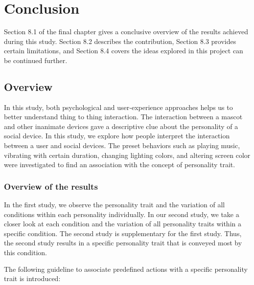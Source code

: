 \chapter{Conclusion}
\label{ch:conclusion}
Section 8.1 of the final chapter gives a conclusive overview of the results achieved during this study.
Section 8.2 describes the contribution, Section 8.3 provides certain limitations,
and Section 8.4 covers the ideas explored in this project can be continued further.

\section{Overview}
\label{sec:overview}
In this study, both psychological and user‐experience approaches helps us to better understand thing to thing interaction.
The interaction between a mascot and other inanimate devices gave a
descriptive clue about the personality of a social device.
In this study, we explore how people interpret the interaction between a user and social devices.
The preset behaviors such as playing music, vibrating with certain duration, changing lighting colors,
and altering screen color were investigated to find an association with the concept of personality trait.

\subsection{Overview of the results}
\label{subsec:overview-of-the-results}
In the first study, we observe the personality trait and the variation of all
conditions within each personality individually.
In our second study, we take a closer look at each condition and the variation of
all personality traits within a specific condition.
The second study is supplementary for the first study.
Thus, the second study results in a specific personality trait that is conveyed most by this condition.

The following guideline to associate predefined actions with a specific personality trait is introduced:

